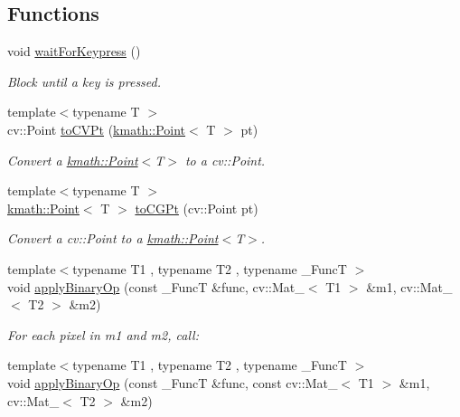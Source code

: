 \subsection*{Functions}
\begin{DoxyCompactItemize}
\item 
void \hyperlink{namespacecvutils_aa292da4b50c7692374fdde56afdd6baf}{wait\-For\-Keypress} ()
\begin{DoxyCompactList}\small\item\em Block until a key is pressed. \end{DoxyCompactList}\item 
{\footnotesize template$<$typename T $>$ }\\cv\-::\-Point \hyperlink{namespacecvutils_a828567eec14cbe1369c315d025f108ba}{to\-C\-V\-Pt} (\hyperlink{structkmath_1_1_point}{kmath\-::\-Point}$<$ T $>$ pt)
\begin{DoxyCompactList}\small\item\em Convert a {\ttfamily \hyperlink{structkmath_1_1_point}{kmath\-::\-Point}$<$T$>$} to a {\ttfamily cv\-::\-Point}. \end{DoxyCompactList}\item 
{\footnotesize template$<$typename T $>$ }\\\hyperlink{structkmath_1_1_point}{kmath\-::\-Point}$<$ T $>$ \hyperlink{namespacecvutils_ab27154874f930e865580b2b3c6afead5}{to\-C\-G\-Pt} (cv\-::\-Point pt)
\begin{DoxyCompactList}\small\item\em Convert a {\ttfamily cv\-::\-Point} to a {\ttfamily \hyperlink{structkmath_1_1_point}{kmath\-::\-Point}$<$T$>$}. \end{DoxyCompactList}\item 
{\footnotesize template$<$typename T1 , typename T2 , typename \-\_\-\-Func\-T $>$ }\\void \hyperlink{namespacecvutils_a9a51cd204369adbf1321482a67c101dc}{apply\-Binary\-Op} (const \-\_\-\-Func\-T \&func, cv\-::\-Mat\-\_\-$<$ T1 $>$ \&m1, cv\-::\-Mat\-\_\-$<$ T2 $>$ \&m2)
\begin{DoxyCompactList}\small\item\em For each pixel in {\ttfamily m1} and {\ttfamily m2}, call\-: \end{DoxyCompactList}\item 
{\footnotesize template$<$typename T1 , typename T2 , typename \-\_\-\-Func\-T $>$ }\\void \hyperlink{namespacecvutils_a624390fc5d29f7ca9f2342f6ae7849be}{apply\-Binary\-Op} (const \-\_\-\-Func\-T \&func, const cv\-::\-Mat\-\_\-$<$ T1 $>$ \&m1, cv\-::\-Mat\-\_\-$<$ T2 $>$ \&m2)

\end{DoxyCompactItemize}
